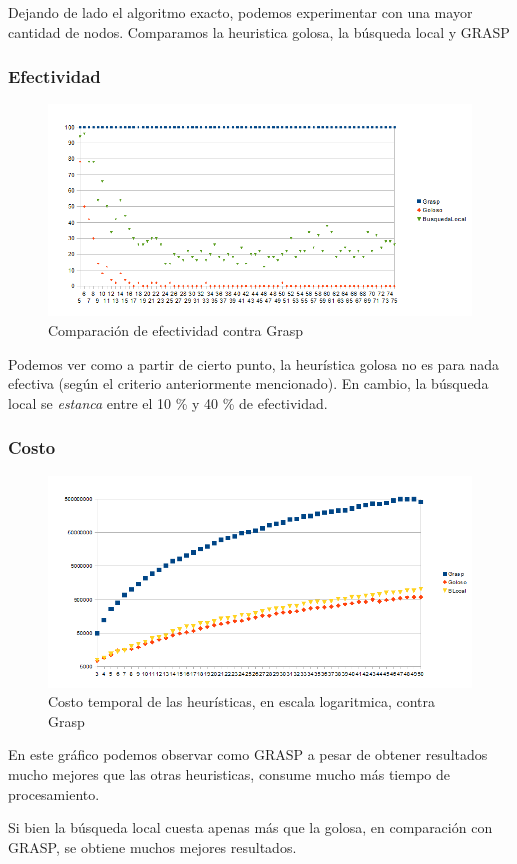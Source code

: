 \quad Dejando de lado el algoritmo exacto, podemos experimentar con una mayor cantidad de nodos. Comparamos la heuristica golosa, la búsqueda local y GRASP

\subsubsection{Efectividad}

\begin{figure}[H]
	\centering
	\includegraphics[scale=0.8]{efectividad-vs-grasp.png}
\caption{Comparación de efectividad contra Grasp}
\end{figure}

\quad Podemos ver como a partir de cierto punto, la heurística golosa no es para nada efectiva (según el criterio anteriormente mencionado). En cambio, la búsqueda local se \textit{estanca} entre el 10 \%  y 40 \%  de efectividad.

\subsubsection{Costo}

\begin{figure}[H]		
	\centering
	\includegraphics[scale=0.8]{timing-vs-grasp.png}
\caption{Costo temporal de las heurísticas, en escala logaritmica, contra Grasp}
\end{figure}

\quad En este gráfico podemos observar como GRASP a pesar de obtener resultados mucho mejores que las otras heuristicas, consume mucho más tiempo de procesamiento.

\quad Si bien la búsqueda local cuesta apenas más que la golosa, en comparación con GRASP, se obtiene muchos mejores resultados.
